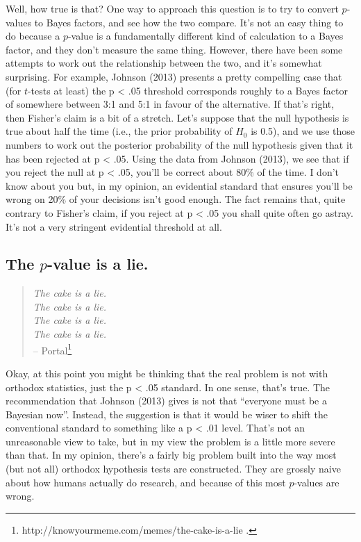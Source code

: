 \documentclass[
  a4paper,
]{book}
\begin{document}
Well, how true is that? One way to approach this question is to try to
convert \(p\)-values to Bayes factors, and see how the two compare. It's
not an easy thing to do because a \(p\)-value is a fundamentally
different kind of calculation to a Bayes factor, and they don't measure
the same thing. However, there have been some attempts to work out the
relationship between the two, and it's somewhat surprising. For example,
Johnson (2013) presents a pretty compelling case that (for \(t\)-tests
at least) the p \textless{} .05 threshold corresponds roughly to a Bayes
factor of somewhere between 3:1 and 5:1 in favour of the alternative. If
that's right, then Fisher's claim is a bit of a stretch. Let's suppose
that the null hypothesis is true about half the time (i.e., the prior
probability of \(H_0\) is 0.5), and we use those numbers to work out the
posterior probability of the null hypothesis given that it has been
rejected at p \textless{} .05. Using the data from Johnson (2013), we
see that if you reject the null at p \textless{} .05, you'll be correct
about 80\% of the time. I don't know about you but, in my opinion, an
evidential standard that ensures you'll be wrong on 20\% of your
decisions isn't good enough. The fact remains that, quite contrary to
Fisher's claim, if you reject at p \textless{} .05 you shall quite often
go astray. It's not a very stringent evidential threshold at all.

\hypertarget{the-p-value-is-a-lie.}{%
\subsection{\texorpdfstring{The \(p\)-value is a
lie.}{The p-value is a lie.}}\label{the-p-value-is-a-lie.}}

\begin{quote}
\emph{The cake is a lie.}\\
\emph{The cake is a lie.}\\
\emph{The cake is a lie.}\\
\emph{The cake is a lie.}\\
-- Portal\footnote{http://knowyourmeme.com/memes/the-cake-is-a-lie .}
\end{quote}

Okay, at this point you might be thinking that the real problem is not
with orthodox statistics, just the p \textless{} .05 standard. In one
sense, that's true. The recommendation that Johnson (2013) gives is not
that ``everyone must be a Bayesian now''. Instead, the suggestion is
that it would be wiser to shift the conventional standard to something
like a p \textless{} .01 level. That's not an unreasonable view to take,
but in my view the problem is a little more severe than that. In my
opinion, there's a fairly big problem built into the way most (but not
all) orthodox hypothesis tests are constructed. They are grossly naive
about how humans actually do research, and because of this most
\(p\)-values are wrong.
\end{document}
